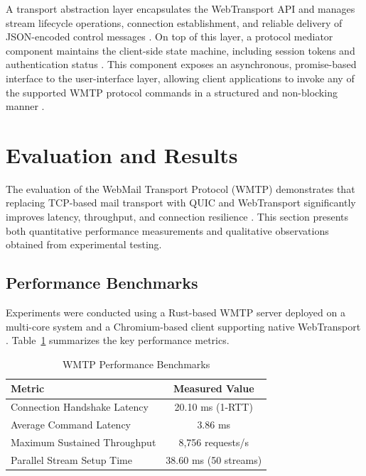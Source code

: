 \documentclass[10pt,a4paper]{article}
\begin{document}
A transport abstraction layer encapsulates the WebTransport
API and manages stream lifecycle operations, connection
establishment, and reliable delivery of JSON-encoded control
messages \cite{webtransport, jmap}. On top of this layer, a
protocol mediator component maintains the client-side state
machine, including session tokens and authentication status
\cite{jmap}. This component exposes an asynchronous,
promise-based interface to the user-interface layer, allowing
client applications to invoke any of the supported WMTP
protocol commands in a structured and non-blocking manner
\cite{quic, webtransport}.
\vspace{12pt}
\section{Evaluation and Results}

The evaluation of the WebMail Transport Protocol (WMTP)
demonstrates that replacing TCP-based mail transport with
QUIC and WebTransport significantly improves latency,
throughput, and connection resilience \cite{quic, webtransport, tls13}.
This section presents both quantitative performance
measurements and qualitative observations obtained from
experimental testing.

\subsection{Performance Benchmarks}

Experiments were conducted using a Rust-based WMTP
server \cite{klabnik2019, rustasync} deployed on a multi-core system and a
Chromium-based client supporting native WebTransport
\cite{webtransport}. Table~\ref{tab:perf} summarizes the key
performance metrics.

\begin{table}[H]
\caption{WMTP Performance Benchmarks}
\centering
\begin{tabular}{|l|c|}
\hline
\textbf{Metric} & \textbf{Measured Value} \\
\hline
Connection Handshake Latency & 20.10 ms (1-RTT) \\
Average Command Latency & 3.86 ms \\
Maximum Sustained Throughput & 8,756 requests/s \\
Parallel Stream Setup Time & 38.60 ms (50 streams) \\
\hline
\end{tabular}
\label{tab:perf}
\end{table}
\end{document}
